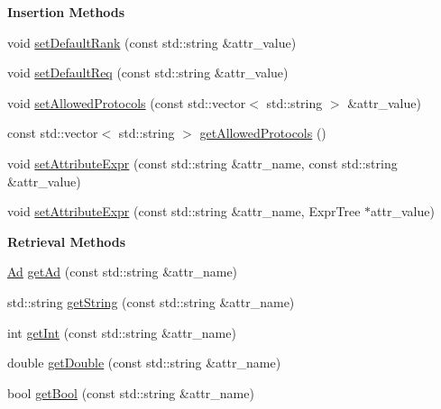 \begin{Indent}{\bf Insertion Methods}\par
\begin{CompactItemize}
\item 
void \hyperlink{classglite_1_1wms_1_1jdl_1_1JobAd_z5_0}{set\-Default\-Rank} (const std::string \&attr\_\-value)
\item 
void \hyperlink{classglite_1_1wms_1_1jdl_1_1JobAd_z5_1}{set\-Default\-Req} (const std::string \&attr\_\-value)
\item 
void \hyperlink{classglite_1_1wms_1_1jdl_1_1JobAd_z5_2}{set\-Allowed\-Protocols} (const std::vector$<$ std::string $>$ \&attr\_\-value)
\item 
const std::vector$<$ std::string $>$ \hyperlink{classglite_1_1wms_1_1jdl_1_1JobAd_z5_3}{get\-Allowed\-Protocols} ()
\item 
void \hyperlink{classglite_1_1wms_1_1jdl_1_1JobAd_z5_4}{set\-Attribute\-Expr} (const std::string \&attr\_\-name, const std::string \&attr\_\-value)
\item 
void \hyperlink{classglite_1_1wms_1_1jdl_1_1JobAd_z5_5}{set\-Attribute\-Expr} (const std::string \&attr\_\-name, Expr\-Tree $\ast$attr\_\-value)
\end{CompactItemize}
\end{Indent}
\begin{Indent}{\bf Retrieval Methods}\par
\begin{CompactItemize}
\item 
\hyperlink{classglite_1_1wms_1_1jdl_1_1Ad}{Ad} \hyperlink{classglite_1_1wms_1_1jdl_1_1JobAd_z7_0}{get\-Ad} (const std::string \&attr\_\-name)
\item 
std::string \hyperlink{classglite_1_1wms_1_1jdl_1_1JobAd_z7_1}{get\-String} (const std::string \&attr\_\-name)
\item 
int \hyperlink{classglite_1_1wms_1_1jdl_1_1JobAd_z7_2}{get\-Int} (const std::string \&attr\_\-name)
\item 
double \hyperlink{classglite_1_1wms_1_1jdl_1_1JobAd_z7_3}{get\-Double} (const std::string \&attr\_\-name)
\item 
bool \hyperlink{classglite_1_1wms_1_1jdl_1_1JobAd_z7_4}{get\-Bool} (const std::string \&attr\_\-name)
\end{CompactItemize}
\end{Indent}
